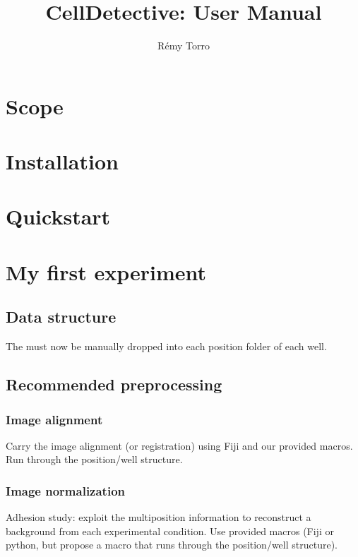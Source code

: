 \documentclass[10pt,a4paper]{article}
\title{CellDetective: User Manual}
\author{Rémy Torro}
\begin{document}
	\maketitle
	\section{Scope}
	\section{Installation}
	\section{Quickstart}
	\section{My first experiment}
	\subsection{Data structure}
	The must now be manually dropped into each position folder of each well.
	\subsection{Recommended preprocessing}
	\subsubsection{Image alignment}
	
	\par{}Carry the image alignment (or registration) using Fiji and our provided macros. Run through the position/well structure.
	
	
	\subsubsection{Image normalization}
	
	\par{Adhesion study: } exploit the multiposition information to reconstruct a background from each experimental condition. Use provided macros (Fiji or python, but propose a macro that runs through the position/well structure).
	
\end{document}
